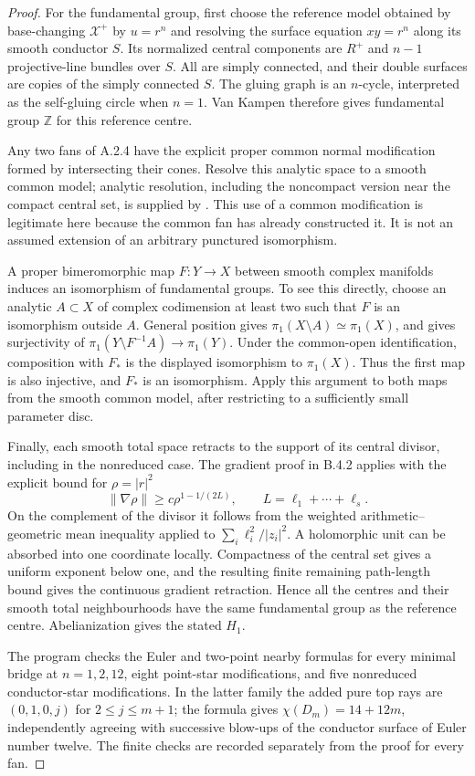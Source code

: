 \begin{proof}
For the fundamental group, first choose the reference
model obtained by base-changing $\mathcal X^+$ by
$u=r^n$ and resolving the surface equation $xy=r^n$
along its smooth conductor $S$. Its normalized central
components are $R^+$ and $n-1$ projective-line bundles
over $S$. All are simply connected, and their double
surfaces are copies of the simply connected $S$.
The gluing graph is an $n$-cycle, interpreted as the
self-gluing circle when $n=1$. Van Kampen therefore
gives fundamental group $\mathbb Z$ for this reference
centre.

Any two fans of A.2.4 have the explicit proper common
normal modification formed by intersecting their cones.
Resolve this analytic space to a smooth common model;
analytic resolution, including the noncompact version
near the compact central set, is supplied by
\cite[Theorem 1.6 and its following paragraph]{BM95AB}.
This use of a common modification is legitimate here
because the common fan has already constructed it.
It is not an assumed extension of an arbitrary punctured
isomorphism.

A proper bimeromorphic map $F:Y\to X$ between smooth
complex manifolds induces an isomorphism of fundamental
groups. To see this directly, choose an analytic
$A\subset X$ of complex codimension at least two such
that $F$ is an isomorphism outside $A$. General position
gives $\pi_1(X\setminus A)\simeq\pi_1(X)$, and gives
surjectivity of
$\pi_1(Y\setminus F^{-1}A)\to\pi_1(Y)$.
Under the common-open identification, composition with
$F_*$ is the displayed isomorphism to $\pi_1(X)$.
Thus the first map is also injective, and $F_*$ is an
isomorphism. Apply this argument to both maps from the
smooth common model, after restricting to a sufficiently
small parameter disc.

Finally, each smooth total space retracts to the support
of its central divisor, including in the nonreduced case.
The gradient proof in B.4.2 applies with the explicit
bound for $\rho=|r|^2$
\[
 \|\nabla\rho\|\geq c\rho^{1-1/(2L)},
 \qquad L=\ell_1+\cdots+\ell_s.
\]
On the complement of the divisor it follows from the
weighted arithmetic--geometric mean inequality applied
to $\sum_i\ell_i^2/|z_i|^2$. A holomorphic unit can be
absorbed into one coordinate locally. Compactness of
the central set gives a uniform exponent below one,
and the resulting finite remaining path-length bound
gives the continuous gradient retraction. Hence all
the centres and their smooth total neighbourhoods have
the same fundamental group as the reference centre.
Abelianization gives the stated $H_1$.

The program 
checks the Euler and two-point nearby formulas for every
minimal bridge at $n=1,2,12$, eight point-star
modifications, and five nonreduced conductor-star
modifications. In the latter family the added pure top
rays are $(0,1,0,j)$ for $2\leq j\leq m+1$; the formula
gives $\chi(D_m)=14+12m$, independently agreeing with
successive blow-ups of the conductor surface of Euler
number twelve. The finite checks are recorded separately
from the proof for every fan.
\end{proof}
